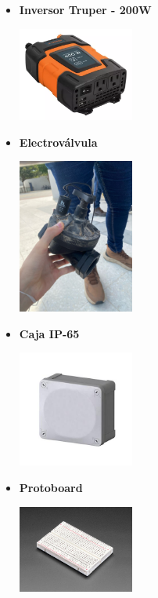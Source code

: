 \documentclass[12pt]{article}
\begin{document}
\begin{itemize}
      \item \textbf{Inversor Truper - 200W}
            \begin{center}
                  \includegraphics[width=0.3\textwidth]{imagenes/inversor.png}
            \end{center}

      \item \textbf{Electroválvula}
            \begin{center}
                  \includegraphics[width=0.3\textwidth]{imagenes/electrovalve2.jpg}
            \end{center}

      \item \textbf{Caja IP-65}
            \begin{center}
                  \includegraphics[width=0.3\textwidth]{imagenes/caja.png}
            \end{center}

      \item \textbf{Protoboard}
            \begin{center}
                  \includegraphics[width=0.3\textwidth]{imagenes/breadboard.png}
            \end{center}


\end{itemize}
\end{document}
